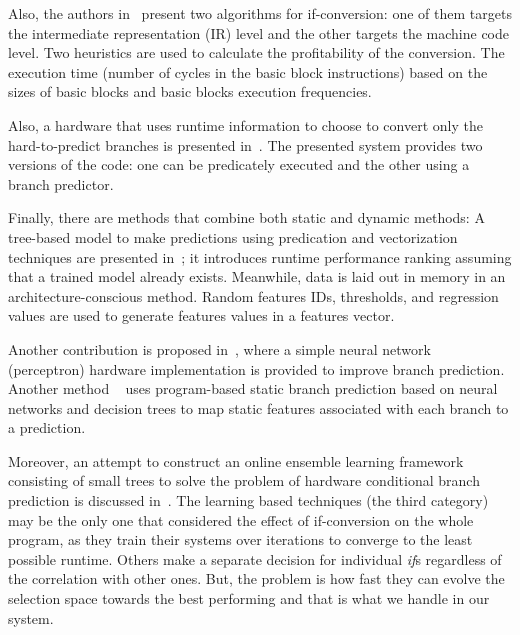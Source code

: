 \documentclass[preprint,nocopyrightspace]{sigplanconf}
\begin{document}
Also, the authors in~\cite{Jordan13} present two algorithms for if-conversion: one of them targets the intermediate representation (IR) level and the other targets the machine code level. Two heuristics are used to calculate the profitability of the conversion. The
execution time (number
of cycles in the basic block instructions) based on the sizes of basic blocks
and basic blocks execution frequencies.

Also, a hardware that uses runtime information to choose to convert only the hard-to-predict branches is presented in~\cite{kim2006wish}. The presented system provides two versions of the code: one can be predicately executed and the other using a branch predictor.

Finally, there are methods that combine both static and dynamic methods: 
A tree-based model to make predictions using predication and vectorization
techniques are presented in~\cite{DBLP:journals/corr/abs-1212-2287}; it introduces runtime performance ranking assuming that a trained model 
already exists. Meanwhile, data is laid out in memory in an architecture-conscious method. Random features IDs, thresholds, and regression values are used to generate features values in a features vector. 

Another contribution is proposed in~\cite{903263}, where a simple neural network (perceptron) hardware implementation is provided to improve branch prediction. Another method ~\cite{Calder:1997:ESB:239912.239923} uses program-based static branch prediction based on neural networks and decision trees to map
static features associated with each branch to a prediction.

Moreover, an attempt to construct an online ensemble learning framework consisting of small trees to solve the problem of hardware conditional branch prediction is discussed in~\cite{fern03}.
The learning based techniques (the third category) may be the only one that considered the effect of if-conversion on the whole program, as they train their systems over iterations to converge to the least possible runtime. Others make a separate decision for individual \textit{if}s regardless of the correlation with other ones. But, the problem is how fast they can evolve the selection space towards the best performing and that is what we handle in our system.
\end{document}
